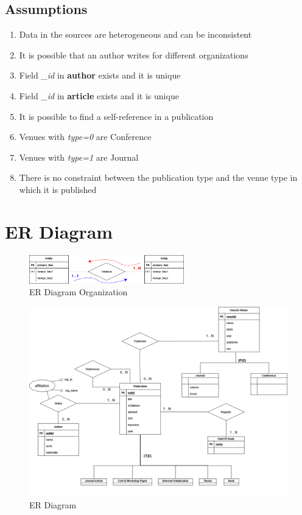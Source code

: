 \documentclass{Configuration_Files/PoliMi3i_thesis}
\begin{document}
\section{Assumptions}
\label{sec:assumptions}
\begin{enumerate}
    \item Data in the sources are heterogeneous and can be inconsistent
    \item It is possible that an author writes for different organizations
    \item Field \emph{\_id} in \textbf{author} exists and it is unique
    \item Field \emph{\_id} in \textbf{article} exists and it is unique
    \item It is possible to find a self-reference in a publication
    \item Venues with \emph{type=0} are Conference
    \item Venues with \emph{type=1} are Journal
    \item There is no constraint between the publication type and the venue type in which it is published
\end{enumerate}

\chapter{ER Diagram}
\begin{figure}[H]
    \centering
    \includegraphics[width=0.6\textwidth]{legendaER.png}
    \caption{ER Diagram Organization}
    \label{fig:erleg}
\end{figure}
\bigskip
\begin{figure}[H]
    \centering
    \includegraphics[width=1\textwidth]{ER.png}
    \caption{ER Diagram}
    \label{fig:er}
\end{figure}
\end{document}
